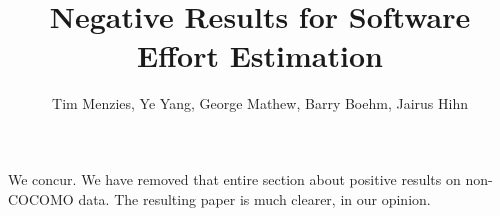 \documentclass[smallcondesed]{svjour3}
\begin{document}
We concur. We have removed that entire section about positive results on non-COCOMO data.
The resulting paper is much clearer, in our opinion.

\newpage
\date{}
%


\title{Negative Results for Software Effort Estimation}


%
%
%
%
%

\author{Tim Menzies, Ye Yang, George Mathew,  Barry Boehm, Jairus Hihn
}
\end{document}

